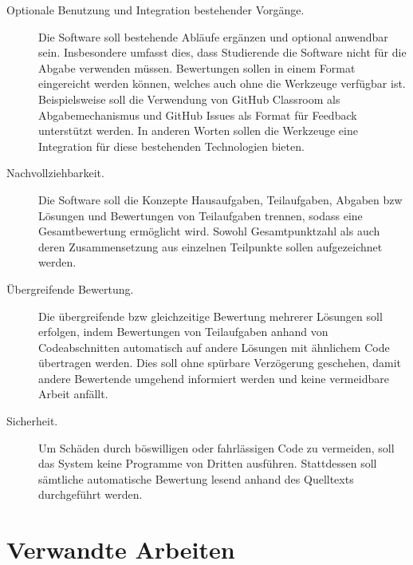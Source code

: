 \begin{description}
    \item[Optionale Benutzung und Integration bestehender Vorgänge.]
    Die Software soll bestehende Abläufe ergänzen und optional anwendbar sein.
    Insbesondere umfasst dies, dass Studierende die Software nicht für die Abgabe verwenden müssen.
    Bewertungen sollen in einem Format eingereicht werden können, welches auch ohne die Werkzeuge verfügbar ist.
    Beispielsweise soll die Verwendung von GitHub Classroom als Abgabemechanismus und GitHub Issues als Format für Feedback unterstützt werden.
    In anderen Worten sollen die Werkzeuge eine Integration für diese bestehenden Technologien bieten.
    \item[Nachvollziehbarkeit.]
    Die Software soll die Konzepte Hausaufgaben, Teilaufgaben, Abgaben \ac{bzw} Lösungen und Bewertungen von Teilaufgaben trennen, sodass eine Gesamtbewertung ermöglicht wird.
    Sowohl Gesamtpunktzahl als auch deren Zusammensetzung aus einzelnen Teilpunkte sollen aufgezeichnet werden.
    \item[Übergreifende Bewertung.]
    Die übergreifende \ac{bzw} gleichzeitige Bewertung mehrerer Lösungen soll erfolgen, indem Bewertungen von Teilaufgaben anhand von Codeabschnitten automatisch auf andere Lösungen mit ähnlichem Code übertragen werden.
    Dies soll ohne spürbare Verzögerung geschehen, damit andere Bewertende umgehend informiert werden und keine vermeidbare Arbeit anfällt.
    \item[Sicherheit.]
    Um Schäden durch böswilligen oder fahrlässigen Code zu vermeiden, soll das System keine Programme von Dritten ausführen.
    Stattdessen soll sämtliche automatische Bewertung lesend anhand des Quelltexts durchgeführt werden.
\end{description}

\section{Verwandte Arbeiten}\label{sec:related-work}

